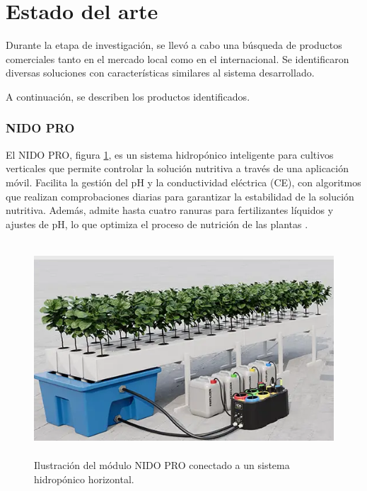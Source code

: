 \section{Estado del arte}
Durante la etapa de investigación, se llevó a cabo una búsqueda de productos comerciales tanto en el mercado local como en el internacional. Se identificaron diversas soluciones con características similares al sistema desarrollado.

A continuación, se describen los productos identificados.

\subsubsection{NIDO PRO}
El NIDO PRO, figura \ref{fig:nido_pro}, es un sistema hidropónico inteligente para cultivos verticales que permite controlar la solución nutritiva a través de una aplicación móvil. Facilita la gestión del pH y la conductividad eléctrica (CE), con algoritmos que realizan comprobaciones diarias para garantizar la estabilidad de la solución nutritiva. Además, admite hasta cuatro ranuras para fertilizantes líquidos y ajustes de pH, lo que optimiza el proceso de nutrición de las plantas \cite{NIDO:PRO}.

\begin{figure}[h]
	\centering
	\includegraphics[height=8cm]{./Figures/nido:pro.png}
	\caption{Ilustración del módulo NIDO PRO conectado a un sistema hidropónico horizontal\protect\footnotemark.}
	\label{fig:nido_pro}
\end{figure}




